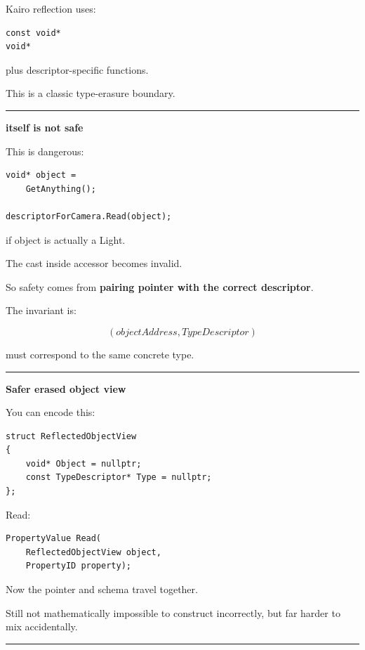 Kairo reflection uses:

\begin{verbatim}
const void*
void*
\end{verbatim}

plus descriptor-specific functions.

This is a classic type-erasure boundary.

\begin{center}\rule{0.5\linewidth}{0.5pt}\end{center}

\textbf{ itself is not safe}

This is dangerous:

\begin{verbatim}
void* object =
    GetAnything();

descriptorForCamera.Read(object);
\end{verbatim}

if object is actually a Light.

The cast inside accessor becomes invalid.

So safety comes from \textbf{pairing pointer with the correct descriptor}.

The invariant is:

\[
\boxed{
(objectAddress,TypeDescriptor)
}
\]

must correspond to the same concrete type.

\begin{center}\rule{0.5\linewidth}{0.5pt}\end{center}

\textbf{Safer erased object view}

You can encode this:

\begin{verbatim}
struct ReflectedObjectView
{
    void* Object = nullptr;
    const TypeDescriptor* Type = nullptr;
};
\end{verbatim}

Read:

\begin{verbatim}
PropertyValue Read(
    ReflectedObjectView object,
    PropertyID property);
\end{verbatim}

Now the pointer and schema travel together.

Still not mathematically impossible to construct incorrectly, but far harder to mix accidentally.

\begin{center}\rule{0.5\linewidth}{0.5pt}\end{center}

